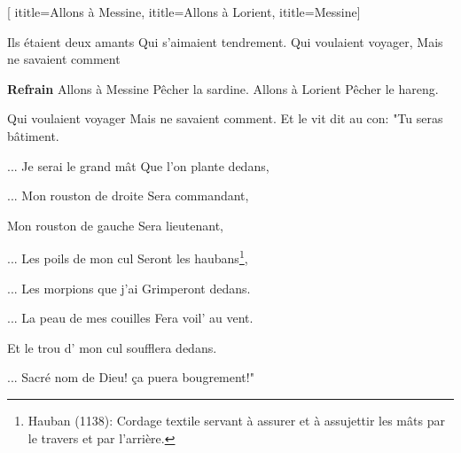 [
ititle={Allons à Messine},
ititle={Allons à Lorient},
ititle={Messine}]

\beginverse
Ils étaient deux amants
Qui s'aimaient tendrement.
Qui voulaient voyager,
Mais ne savaient comment
\endverse

\beginchorus
\textbf {Refrain}
Allons à Messine
Pêcher la sardine.
Allons à Lorient
Pêcher le hareng.
\endchorus

\beginverse
Qui voulaient voyager
Mais ne savaient comment.
Et le vit dit au con:
"Tu seras bâtiment.
\endverse

\beginverse
... Je serai le grand mât
Que l'on plante dedans,
\endverse

\beginverse
... Mon rouston de droite
Sera commandant,
\endverse

\beginverse
Mon rouston de gauche
Sera lieutenant,
\endverse

\beginverse
... Les poils de mon cul
Seront les haubans\footnote{Hauban (1138): Cordage textile servant à assurer et à assujettir les mâts par le travers et par l'arrière.},
\endverse

\beginverse
... Les morpions que j'ai
Grimperont dedans.
\endverse

\beginverse
... La peau de mes couilles
Fera voil' au vent.
\endverse

\beginverse
Et le trou d' mon cul
soufflera dedans.
\endverse

\beginverse
... Sacré nom de Dieu!
ça puera bougrement!"
\endverse

\endsong